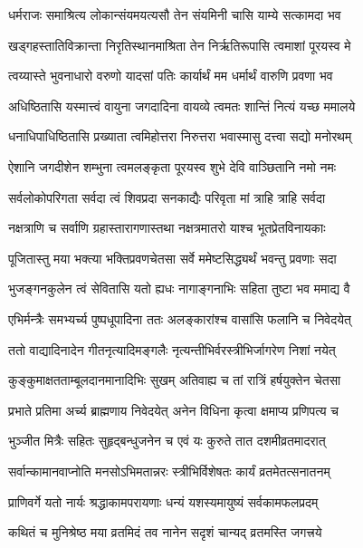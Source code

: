 \twolineshloka
{धर्मराजः समाश्रित्य लोकान्संयमयत्यसौ}
{तेन संयमिनी चासि याम्ये सत्कामदा भव} %

\twolineshloka
{खड्गहस्तातिविक्रान्ता निरृतिस्थानमाश्रिता}
{तेन निर्ऋतिरूपासि त्वमाशां पूरयस्व मे} %

\twolineshloka
{त्वय्यास्ते भुवनाधारो वरुणो यादसां पतिः}
{कार्यार्थं मम धर्मार्थं वारुणि प्रवणा भव} %

\twolineshloka
{अधिष्ठितासि यस्मात्त्वं वायुना जगदादिना}
{वायव्ये त्वमतः शान्तिं नित्यं यच्छ ममालये} %

\twolineshloka
{धनाधिपाधिष्ठितासि प्रख्याता त्वमिहोत्तरा}
{निरुत्तरा भवास्मासु दत्त्वा सद्यो मनोरथम्} %

\twolineshloka
{ऐशानि जगदीशेन शम्भुना त्वमलङ्कृता}
{पूरयस्व शुभे देवि वाञ्छितानि नमो नमः} %

\twolineshloka
{सर्वलोकोपरिगता सर्वदा त्वं शिवप्रदा}
{सनकाद्यैः परिवृता मां त्राहि त्राहि सर्वदा} %

\twolineshloka
{नक्षत्राणि च सर्वाणि ग्रहास्तारागणास्तथा}
{नक्षत्रमातरो याश्च भूतप्रेतविनायकाः} %

\twolineshloka
{पूजितास्तु मया भक्त्या भक्तिप्रवणचेतसा}
{सर्वे ममेष्टसिद्ध्यर्थं भवन्तु प्रवणाः सदा} %

\twolineshloka
{भुजङ्गनकुलेन त्वं सेवितासि यतो ह्यधः}
{नागाङ्गनाभिः सहिता तुष्टा भव ममाद्य वै} %

\twolineshloka
{एभिर्मन्त्रैः समभ्यर्च्य पुष्पधूपादिना ततः}
{अलङ्कारांश्च वासांसि फलानि च निवेदयेत्} %

\twolineshloka
{ततो वाद्यादिनादेन गीतनृत्यादिमङ्गलैः}
{नृत्यन्तीभिर्वरस्त्रीभिर्जागरेण निशां नयेत्} %

\twolineshloka
{कुङ्कुमाक्षतताम्बूलदानमानादिभिः सुखम्}
{अतिवाह्य च तां रात्रिं हर्षयुक्तेन चेतसा} %

\twolineshloka
{प्रभाते प्रतिमा अर्च्य ब्राह्मणाय निवेदयेत्}
{अनेन विधिना कृत्वा क्षमाप्य प्रणिपत्य च} %

\twolineshloka
{भुञ्जीत मित्रैः सहितः सुहृद्बन्धुजनेन च}
{एवं यः कुरुते तात दशमीव्रतमादरात्} %

\twolineshloka
{सर्वान्कामानवाप्नोति मनसोऽभिमतान्नरः}
{स्त्रीभिर्विशेषतः कार्यं व्रतमेतत्सनातनम्} %

\twolineshloka
{प्राणिवर्गे यतो नार्यः श्रद्धाकामपरायणाः}
{धन्यं यशस्यमायुष्यं सर्वकामफलप्रदम्} %

\twolineshloka
{कथितं च मुनिश्रेष्ठ मया व्रतमिदं तव}
{नानेन सदृशं चान्यद् व्रतमस्ति जगत्त्रये} %

